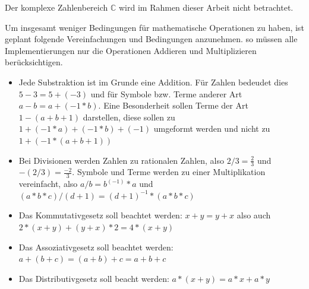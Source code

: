 \documentclass[11pt,a4paper, ngerman]{article}
\begin{document}
Der komplexe Zahlenbereich  $\mathbb{C}$ wird im Rahmen dieser Arbeit nicht betrachtet.

Um insgesamt weniger Bedingungen für mathematische Operationen zu haben, ist geplant folgende Vereinfachungen und Bedingungen anzunehmen. so müssen alle Implementierungen nur die Operationen Addieren und Multiplizieren berücksichtigen.
\begin{itemize}
    \item Jede Substraktion ist im Grunde eine Addition. Für Zahlen bedeudet dies $5-3 = 5+(-3)$ und für Symbole bzw. Terme anderer Art $a-b = a+(-1 * b)$. Eine Besonderheit sollen Terme der Art $1-(a+b+1)$ darstellen, diese sollen zu $1+(-1*a)+(-1*b)+(-1)$ umgeformt werden und nicht zu $1+(-1*(a+b+1))$
    \item Bei Divisionen werden Zahlen zu rationalen Zahlen, also $2/3 = \frac{2}{3}$ und $-(2/3) = \frac{-2}{3}$. Symbole und Terme werden zu einer Multiplikation vereinfacht, also $a/b = b^{(-1)} * a$ und $(a*b*c)/(d+1) = (d+1)^{-1} * (a*b*c)$
    \item Das Kommutativgesetz soll beachtet werden: $x+y = y+x$ also auch $2*(x+y) + (y+x)*2 = 4*(x+y)$
    \item Das Assoziativgesetz soll beachtet werden: $a+(b+c) = (a+b)+c = a+b+c$
    \item Das Distributivgesetz soll beacht werden: $a*(x+y) = a*x + a*y$
\end{itemize}
\end{document}
